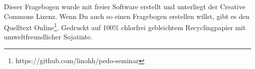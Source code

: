 \documentclass[a4paper,10pt,BCOR10mm,oneside,headsepline]{scrartcl}
\begin{document}
\vfill
{}
Dieser Fragebogen wurde mit freier Software erstellt und unterliegt der Creative Commons Lizenz. Wenn Du auch so einen Fragebogen erstellen willst, gibt es den Quelltext Online\footnote{https://github.com/linohh/pedo-seminar}.
\vskip0.5cm
\cc \bysa \hskip0.2cm \small{Gedruckt auf 100\% chlorfrei gebleichtem Recyclingpapier mit umweltfreundlicher Sojatinte.}
\end{document}
